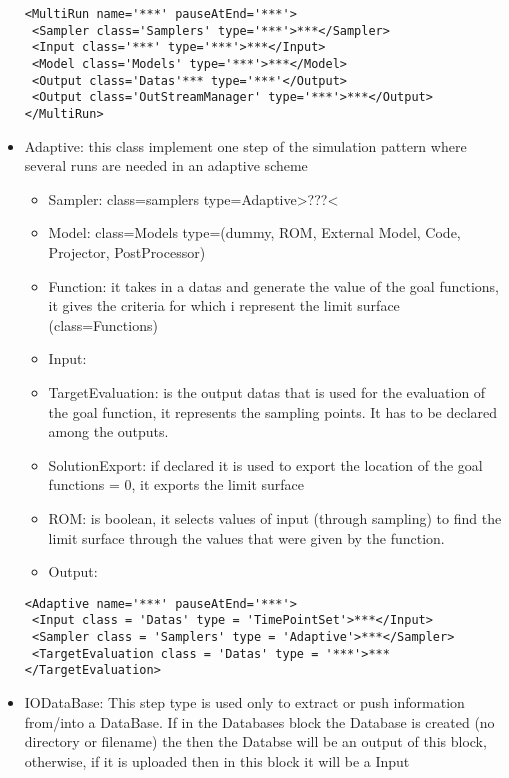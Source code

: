 \begin{itemize}
\begin{itemize}
\end{itemize}
\begin{lstlisting}[style=XML]
<MultiRun name='***' pauseAtEnd='***'>
 <Sampler class='Samplers' type='***'>***</Sampler>
 <Input class='***' type='***'>***</Input>
 <Model class='Models' type='***'>***</Model>
 <Output class='Datas'*** type='***'</Output>
 <Output class='OutStreamManager' type='***'>***</Output>
</MultiRun>
\end{lstlisting}
\item Adaptive: this class implement one step of the simulation pattern where several runs are needed in an adaptive scheme
\begin{itemize}
\item Sampler: class=samplers type=Adaptive>???<
\item Model: class=Models type=(dummy, ROM, External Model, Code, Projector, PostProcessor)
\item Function: it takes in a datas and generate the value of the goal functions, it gives the criteria for which i represent the limit surface (class=Functions)
\item Input:
\item TargetEvaluation: is the output datas that is used for the evaluation of the goal function, it represents the sampling points. It has to be declared among the outputs. 
\item SolutionExport: if declared it is used to export the location of the goal functions = 0, it exports the limit surface
\item ROM: is boolean, it selects values of input (through sampling) to find the limit surface through the values that were given by the function. 
\item Output:
\end{itemize}
\begin{lstlisting}[style=XML]
<Adaptive name='***' pauseAtEnd='***'> 
 <Input class = 'Datas' type = 'TimePointSet'>***</Input>
 <Sampler class = 'Samplers' type = 'Adaptive'>***</Sampler>
 <TargetEvaluation class = 'Datas' type = '***'>***</TargetEvaluation>
\end{lstlisting}
\item IODataBase: This step type is used only to extract or push information from/into a DataBase. If in the Databases block the Database is created (no directory or filename) the then the Databse will be an output of this block, otherwise, if it is uploaded then in this block it will be a Input

\end{itemize}
